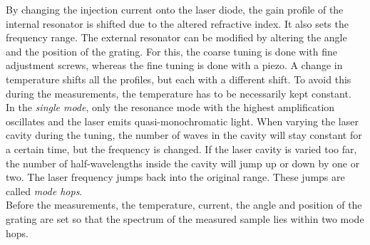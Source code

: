 By changing the injection current onto the laser diode, the gain profile of the internal resonator is shifted due to the altered refractive index. It also sets the frequency range. The external resonator can be modified by altering the angle and the position of the grating. For this, the coarse tuning is done with fine adjustment screws, whereas the fine tuning is done with a piezo. A change in temperature shifts all the profiles, but each with a different shift. To avoid this during the measurements, the temperature has to be necessarily kept constant.\\
In the \emph{single mode}, only the resonance mode with the highest amplification oscillates and the laser emits quasi-monochromatic light.
When varying the laser cavity during the tuning, the number of waves in the cavity will stay constant for a certain time, but the frequency is changed. If the laser cavity is varied too far, the number of half-wavelengths inside the cavity will jump up or down by one or two. The laser frequency jumps back into the original range. These jumps are called \emph{mode hops}.\\
Before the measurements, the temperature, current, the angle and position of the grating are set so that the spectrum of the measured sample lies within two mode hops.
